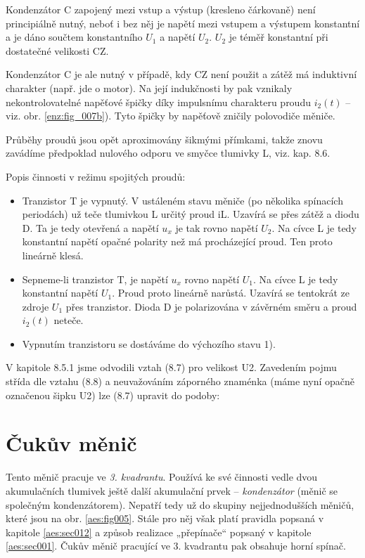 {    \begin{note}
      Kondenzátor C zapojený mezi vstup a výstup (kresleno čárkovaně) není principiálně nutný, 
      neboť i bez něj je napětí mezi vstupem a výstupem konstantní a je dáno součtem konstantního 
      \(U_1\) a napětí \(U_2\). \(U_2\) je téměř konstantní při dostatečné velikosti CZ.
      
      Kondenzátor C je ale nutný v případě, kdy CZ není použit a zátěž má induktivní charakter 
      (např. jde o motor). Na její indukčnosti by pak vznikaly nekontrolovatelné napěťové špičky 
      díky impulsnímu charakteru proudu \(i_2(t)\) – viz. obr. \ref{enz:fig_007b}). Tyto špičky by 
      napěťově zničily polovodiče měniče.
    \end{note}
    
    Průběhy proudů jsou opět aproximovány šikmými přímkami, takže znovu zavádíme předpoklad
    nulového odporu ve smyčce tlumivky L, viz. kap. 8.6.
    
    Popis činnosti v režimu spojitých proudů:
    \begin{itemize}
      \item Tranzistor T je vypnutý. V ustáleném stavu měniče (po několika spínacích periodách) už 
            teče tlumivkou L určitý proud iL. Uzavírá se přes zátěž a diodu D. Ta je tedy otevřená 
            a napětí \(u_x\) je tak rovno napětí \(U_2\). Na cívce L je tedy konstantní napětí 
            opačné polarity než má procházející proud. Ten proto lineárně klesá.
      \item Sepneme-li tranzistor T, je napětí \(u_x\) rovno napětí \(U_1\). Na cívce L je tedy 
            konstantní napětí \(U_1\). Proud proto lineárně narůstá. Uzavírá se tentokrát ze zdroje 
            \(U_1\) přes tranzistor. Dioda D je polarizována v závěrném směru a proud \(i_2(t)\) 
            neteče.
      \item Vypnutím tranzistoru se dostáváme do výchozího stavu 1).
    \end{itemize}
    
    V kapitole 8.5.1 jsme odvodili vztah (8.7) pro velikost U2. Zavedením pojmu střída dle vztahu 
    (8.8) a neuvažováním záporného znaménka (máme nyní opačně označenou šipku U2) lze (8.7) upravit 
    do podoby:
    
  \section{Čukův měnič}\label{aes:sec004}
    Tento měnič pracuje ve \emph{3. kvadrantu}. Používá ke své činnosti vedle dvou akumulačních 
    tlumivek ještě další akumulační prvek – \emph{kondenzátor} (měnič se společným kondenzátorem). 
    Nepatří tedy už do skupiny nejjednodušších měničů, které jsou na obr. \ref{aes:fig005}. Stále 
    pro něj však platí pravidla popsaná v kapitole \ref{aes:sec012} a způsob realizace „přepínače“ 
    popsaný v kapitole \ref{aes:sec001}. Čukův měnič pracující ve 3. kvadrantu pak obsahuje horní 
    spínač.
    
}
